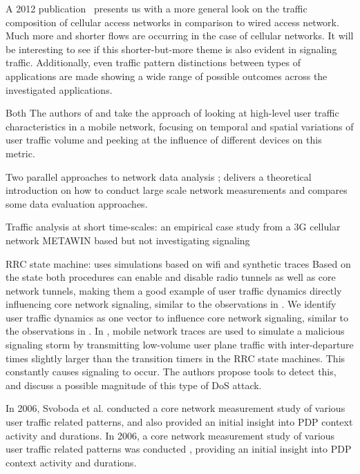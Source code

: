 A 2012 publication~\cite{Zhang:2012:UCC:2377677.2377764} presents us with a more general look on the traffic composition of cellular access networks in comparison to wired access network. Much more and shorter flows are occurring in the case of cellular networks.
It will be interesting to see if this shorter-but-more theme is also evident in signaling traffic. Additionally, even traffic pattern distinctions between types of applications are made showing a wide range of possible outcomes across the investigated applications.

Both The authors of \cite{shafiq2011characterizing} and \cite{paul2011understanding} take the approach of looking at high-level user traffic characteristics in a mobile network, focusing on temporal and spatial variations of user traffic volume and peeking at the influence of different devices on this metric. 


Two parallel approaches to network data analysis ; \cite{baer2011two} delivers a theoretical introduction on how to conduct large scale network measurements and compares some data evaluation approaches.


Traffic analysis at short time-scales: an empirical case study from a 3G cellular network \cite{4570772} METAWIN based but not investigating signaling


\gls{RRC} state machine:
uses simulations based on wifi and synthetic traces
Based on the state both procedures can enable and disable radio tunnels as well as core network tunnels, making them a good example of user traffic dynamics directly influencing core network signaling, similar to the observations in \cite{lee2007detection}. 
We identify user traffic dynamics as one vector to influence core network signaling, similar to the observations in \cite{lee2007detection}.
In \cite{lee2007detection}, mobile network traces are used to simulate a malicious signaling storm by transmitting low-volume user plane traffic with inter-departure times slightly larger than the transition timers in the \gls{RRC} state machines. This constantly causes signaling to occur. The authors propose tools to detect this, and discuss a possible magnitude of this type of \gls{DoS} attack.


In 2006, Svoboda et al. \cite{svoboda2006composition} conducted a core network measurement study of various user traffic related patterns, and also provided an initial insight into \gls{PDP} context activity and durations.
In 2006, a core network measurement study of various user traffic related patterns was conducted \cite{svoboda2006composition}, providing an initial insight into \gls{PDP} context activity and durations.


